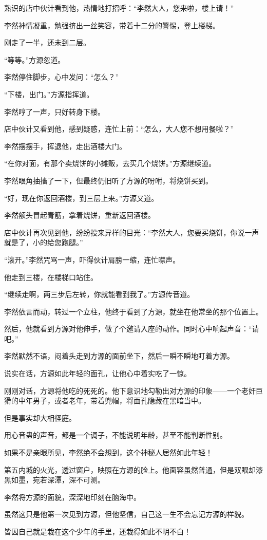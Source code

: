 \begin{this_body}
熟识的店中伙计看到他，热情地打招呼：“李然大人，您来啦，楼上请！”

李然神情凝重，勉强挤出一丝笑容，带着十二分的警惕，登上楼梯。

刚走了一半，还未到二层。

“等等。”方源忽道。

李然停住脚步，心中发问：“怎么？”

“下楼，出门。”方源指挥道。

李然哼了一声，只好转身下楼。

店中伙计又看到他，感到疑惑，连忙上前：“怎么，大人您不想用餐啦？”

李然摆摆手，挥退他，走出酒楼大门。

“在你对面，有那个卖烧饼的小摊贩，去买几个烧饼。”方源继续道。

李然眼角抽搐了一下，但最终仍旧听了方源的吩咐，将烧饼买到。

“好，现在你返回酒楼，到三层上来。”方源又道。

李然额头冒起青筋，拿着烧饼，重新返回酒楼。

店中伙计再次见到他，纷纷投来异样的目光：“李然大人，您要买烧饼，你说一声就是了，小的给您跑腿。”

“滚开。”李然咒骂一声，吓得伙计肩膀一缩，连忙噤声。

他走到三楼，在楼梯口站住。

“继续走啊，两三步后左转，你就能看到我了。”方源传音道。

李然依言而动，转过一个立柱，他终于看到了方源，就坐在他常坐的那个位置上。

然后，他就看到方源对他伸手，做了个邀请入座的动作。同时心中响起声音：“请吧。”

李然默然不语，闷着头走到方源的面前坐下，然后一瞬不瞬地盯着方源。

说实在话，方源如此年轻的面孔，让他心中着实吃了一惊。

刚刚对话，方源将他吃的死死的。他下意识地勾勒出对方源的印象——一个老奸巨猾的中年男子，或者老年，带着兜帽，将面孔隐藏在黑暗当中。

但是事实却大相径庭。

用心音蛊的声音，都是一个调子，不能说明年龄，甚至不能判断性别。

如果不是亲眼所见，李然绝不会想到，这个神秘人居然如此年轻！

第五内城的火光，透过窗户，映照在方源的脸上。他面容虽然普通，但是双眼却漆黑如墨，宛若深潭，深不可测。

李然将方源的面貌，深深地印刻在脑海中。

虽然这只是他第一次见到方源，但他坚信，自己这一生不会忘记方源的样貌。

皆因自己就是栽在这个少年的手里，还栽得如此不明不白！

\end{this_body}

